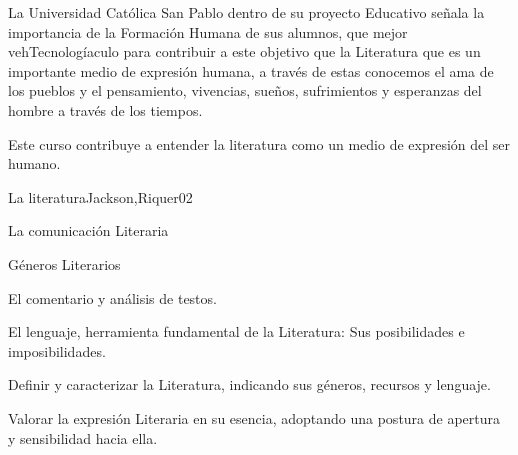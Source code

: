 \begin{syllabus}


\begin{justification}
La Universidad Católica San Pablo dentro de su proyecto Educativo señala la importancia de la Formación Humana de sus alumnos, que mejor vehTecnologíaculo para contribuir a este objetivo que la Literatura que es un importante medio de expresión humana, a través de estas  conocemos el ama de los pueblos y el pensamiento, vivencias, sueños, sufrimientos y esperanzas del hombre a través de los tiempos.
\end{justification}

\begin{goals}
\item Este curso contribuye a entender la literatura como un medio de expresión del ser humano.
\end{goals}

\begin{outcomes}
\end{outcomes}

\begin{unit}{La literatura}{Jackson,Riquer}{0}{2}
\begin{topics}
	\item La comunicación Literaria
	\item Géneros Literarios
	\item El comentario y análisis de testos.
	\item El lenguaje, herramienta fundamental de la Literatura: Sus posibilidades e imposibilidades.
\end{topics}
\begin{learningoutcomes}
	\item Definir y caracterizar la Literatura, indicando sus géneros, recursos y lenguaje.
	\item Valorar la expresión Literaria en su esencia, adoptando una postura de apertura y sensibilidad hacia ella.
\end{learningoutcomes}
\end{unit}


\end{syllabus}
